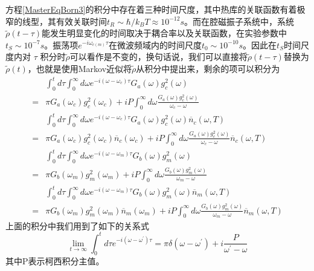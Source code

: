 方程\eqref{MasterEqBorn3}的积分中存在着三种时间尺度，其中热库的关联函数有着极窄的线型\cite{carmichael1999statistical}，其有效关联时间$t_R \sim \hbar/k_B T \approx 10^{-12}s$。而在腔磁振子系统中，系统$\tilde{\rho} (t-\tau)$能发生明显变化的时间取决于耦合率以及关联函数，在实验参数中$t_S \sim 10^{-7}s$。振荡项$e^{-i \omega_{c(m)} \tau}$在微波频域内的时间尺度$t_0 \sim 10^{-10}s$。因此在$t_S$时间尺度内对 $\tau$ 积分时$\tilde{\rho}$可以看作是不变的，换句话说，我们可以直接将$\tilde{\rho} (t-\tau)$替换为$\tilde{\rho} (t)$，也就是使用Markov近似将$\tilde{\rho}$从积分中提出来，剩余的项可以积分为
\begin{equation}
\begin{aligned}
&\int_{0}^{t} d \tau \int_{0}^{\infty} d \omega e^{-i\left(\omega-\omega_{c}\right) \tau} G_a(\omega) g_{c}^{2}(\omega) \\
={}&\pi G_a(\omega_c) g_{c}^{2}(\omega_c)+i P \int_{0}^{\infty} d \omega \frac{G_a(\omega) g_{c}^{2}(\omega)}{\omega_{c}-\omega} \\
&\int_{0}^{t} d \tau \int_{0}^{\infty} d \omega e^{-i\left(\omega-\omega_{c}\right) \tau} G_a(\omega) g_{c}^{2}(\omega) \overline{n}_c(\omega, T) \\
={}&\pi G_a(\omega_c) g_{c}^{2}(\omega_c)\overline{n}_c(\omega_c)+i P \int_{0}^{\infty} d \omega \frac{G_a(\omega) g_{c}^{2}(\omega)}{\omega_{c}-\omega} \overline{n}_c(\omega, T) \\
&\int_{0}^{t} d \tau \int_{0}^{\infty} d \omega e^{-i\left(\omega-\omega_{m}\right) \tau} G_b(\omega) g_{m}^{2}(\omega) \\
={}&\pi G_b(\omega_m) g_{m}^{2}(\omega_m)+i P \int_{0}^{\infty} d \omega \frac{G_b(\omega) g_{m}^{2}(\omega)}{\omega_{m}-\omega} \\
&\int_{0}^{t} d \tau \int_{0}^{\infty} d \omega e^{-i\left(\omega-\omega_{m}\right) \tau} G_b(\omega) g_{m}^{2}(\omega) \overline{n}_m(\omega, T) \\
={}&\pi G_b(\omega_m) g_{m}^{2}(\omega_m)\overline{n}_m(\omega_m)+i P \int_{0}^{\infty} d \omega \frac{G_b(\omega) g_{m}^{2}(\omega)}{\omega_{m}-\omega} \overline{n}_m(\omega, T)
\label{IntergralCorrelations}
\end{aligned}
\end{equation}
上面的积分中我们用到了如下的关系式
\begin{equation}
\lim _{t \rightarrow \infty} \int_{0}^{t} d \tau e^{-i\left(\omega-\omega^{\prime}\right) \tau}=\pi \delta\left(\omega-\omega^{\prime}\right)+i \frac{P}{\omega^{\prime}-\omega}
\end{equation}
其中P表示柯西积分主值。

